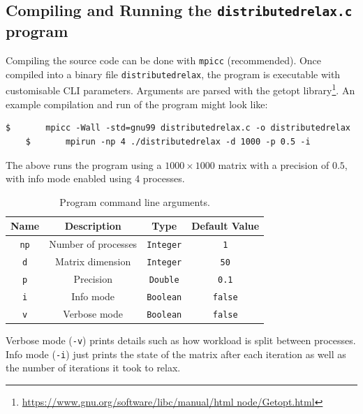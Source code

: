 \documentclass[11pt]{article}
\begin{document}
\footnotesize

\normalsize
\begin{appendices}
{\color{indigo}
\section{Compiling and Running the \texttt{distributedrelax.c} program}
\label{apdx:runprog}}
Compiling the source code can be done with \texttt{mpicc} (recommended). Once compiled into a binary file \texttt{distributedrelax}, the program is executable with customisable CLI parameters. Arguments are parsed with the getopt library\footnote{\url{https://www.gnu.org/software/libc/manual/html node/Getopt.html}}. An example compilation and run of the program might look like:	
\begin{lstlisting}[style=BashInputStyle]
    $		mpicc -Wall -std=gnu99 distributedrelax.c -o distributedrelax
    $		mpirun -np 4 ./distributedrelax -d 1000 -p 0.5 -i
\end{lstlisting}

The above runs the program using a $1000 \times 1000$ matrix with a precision of $0.5$, with info mode enabled using 4 processes.

\begin{table}[h]
\begin{center}
\caption{Program command line arguments.}
\label{tbl:CLIargs}
\begin{tabular}{|c|c|c|c|}
\hline
\textbf{Name} & \textbf{Description} & \textbf{Type} & \textbf{Default Value} \\
\hline
\texttt{np} & Number of processes & \texttt{Integer} & \texttt{1}\\
\texttt{d} & Matrix dimension & \texttt{Integer} & \texttt{50}\\
\texttt{p} & Precision & \texttt{Double} & \texttt{0.1}\\
\texttt{i} & Info mode & \texttt{Boolean} & \texttt{false}\\
\texttt{v} & Verbose mode & \texttt{Boolean} & \texttt{false}\\
\hline
\end{tabular}
\end{center}
\end{table}

Verbose mode (\texttt{-v}) prints details such as how workload is split between processes. Info mode (\texttt{-i}) just prints the state of the matrix after each iteration as well as the number of iterations it took to relax.


\end{appendices}
\end{document}
